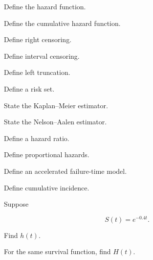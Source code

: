 \begin{exercise}[1]
Define the hazard function.
\end{exercise}

\begin{exercise}[1]
Define the cumulative hazard function.
\end{exercise}

\begin{exercise}[1]
Define right censoring.
\end{exercise}

\begin{exercise}[1]
Define interval censoring.
\end{exercise}

\begin{exercise}[1]
Define left truncation.
\end{exercise}

\begin{exercise}[1]
Define a risk set.
\end{exercise}

\begin{exercise}[1]
State the Kaplan--Meier estimator.
\end{exercise}

\begin{exercise}[1]
State the Nelson--Aalen estimator.
\end{exercise}

\begin{exercise}[1]
Define a hazard ratio.
\end{exercise}

\begin{exercise}[1]
Define proportional hazards.
\end{exercise}

\begin{exercise}[1]
Define an accelerated failure-time model.
\end{exercise}

\begin{exercise}[1]
Define cumulative incidence.
\end{exercise}

\begin{exercise}[2]
Suppose

\[
S(t)=e^{-0.4t}.
\]

Find \(h(t)\).
\end{exercise}

\begin{exercise}[2]
For the same survival function, find \(H(t)\).
\end{exercise}

